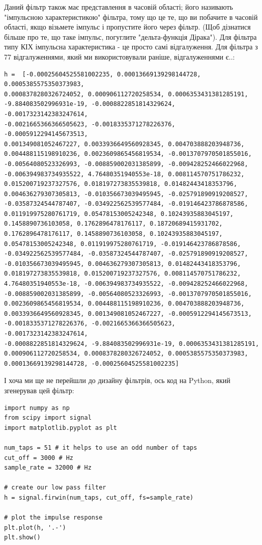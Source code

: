 Даний фільтр також має представлення в часовій області; його називають
"імпульсною характеристикою" фільтра, тому що це те, що ви побачите в
часовій області, якщо візьмете імпульс і пропустите його через фільтр.
(Щоб дізнатися більше про те, що таке імпульс, погуглите "дельта-функція
Дірака"). Для фільтра типу КІХ імпульсна характеристика - це просто самі
відгалуження. Для фільтра з 77 відгалуженнями, який ми використовували
раніше, відгалуженнями є..:

\begin{Verbatim}[breaklines=true,breakanywhere=true,fontsize=\small]
h =  [-0.00025604525581002235, 0.00013669139298144728, 0.0005385575350373983,
0.0008378280326724052, 0.000906112720258534, 0.0006353431381285191,
-9.884083502996931e-19, -0.0008822851814329624, -0.0017323142383247614,
-0.0021665366366505623, -0.0018335371278226376, -0.0005912294145673513,
0.001349081052467227, 0.0033936649560928345, 0.004703888203948736,
0.004488115198910236, 0.0023609865456819534, -0.0013707970501855016,
-0.00564080523326993, -0.008859002031385899, -0.009428252466022968,
-0.006394983734935522, 4.76480351940553e-18, 0.008114570751786232,
0.015200719237327576, 0.018197273835539818, 0.01482443418353796,
0.004636279307305813, -0.010356673039495945, -0.025791890919208527,
-0.03587324544787407, -0.034922562539577484, -0.019146423786878586,
0.011919975280761719, 0.05478153005242348, 0.10243935883045197,
0.1458890736103058, 0.1762896478176117, 0.18720689415931702,
0.1762896478176117, 0.1458890736103058, 0.10243935883045197,
0.05478153005242348, 0.011919975280761719, -0.019146423786878586,
-0.034922562539577484, -0.03587324544787407, -0.025791890919208527,
-0.010356673039495945, 0.004636279307305813, 0.01482443418353796,
0.018197273835539818, 0.015200719237327576, 0.008114570751786232,
4.76480351940553e-18, -0.006394983734935522, -0.009428252466022968,
-0.008859002031385899, -0.00564080523326993, -0.0013707970501855016,
0.0023609865456819534, 0.004488115198910236, 0.004703888203948736,
0.0033936649560928345, 0.001349081052467227, -0.0005912294145673513,
-0.0018335371278226376, -0.0021665366366505623, -0.0017323142383247614,
-0.0008822851814329624, -9.884083502996931e-19, 0.0006353431381285191,
0.000906112720258534, 0.0008378280326724052, 0.0005385575350373983,
0.00013669139298144728, -0.00025604525581002235]
\end{Verbatim}

І хоча ми ще не перейшли до дизайну фільтрів, ось код на Python, який
згенерував цей фільтр:

\begin{Verbatim}[breaklines=true,breakanywhere=true,fontsize=\small]
import numpy as np
from scipy import signal
import matplotlib.pyplot as plt

num_taps = 51 # it helps to use an odd number of taps
cut_off = 3000 # Hz
sample_rate = 32000 # Hz

# create our low pass filter
h = signal.firwin(num_taps, cut_off, fs=sample_rate)

# plot the impulse response
plt.plot(h, '.-')
plt.show()
\end{Verbatim}


